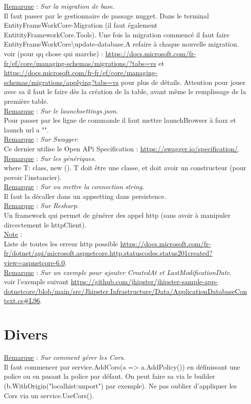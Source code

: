 \documentclass[a4paper,12pt,twoside]{article}
\newcommand{\rem}[2]{\noindent\underline{Remarque} : \textit{#1}.\\ \indent #2}
\newcommand{\note}[1]{\noindent\underline{Note} : \\ \indent #1}
\begin{document}
\rem{Sur la migration de base}{Il faut passer par le gestionnaire de passage nugget. Dans le terminal EntityFrameWorkCore\Add-Migration (il faut également EntitityFrameworkCore.Tools). Une fois la migration commencé il faut faire EntityFrameWorkCore\textbackslash update-database.A refaire à chaque nouvelle migration. voir (pour qq chose qui marche) : \url{https://docs.microsoft.com/fr-fr/ef/core/managing-schemas/migrations/?tabs=vs} et \url{https://docs.microsoft.com/fr-fr/ef/core/managing-schemas/migrations/applying?tabs=vs} pour plus de détails. Attention pour jouer avec sa il faut le faire dès la création de la table, avant même le remplissage de la première table.}\\

\rem{Sur le launchsettings.json}{Pour passer par les ligne de commande il faut mettre launchBrowser à faux et launch url a "".}\\

\rem{Sur Swagger}{Ce dernier utilise le Open APi Specification : \url{https://swagger.io/specification/}.}\\

\rem{Sur les génériques}{where T: class, new (). T doit être une classe, et doit avoir un constructeur (pour povoir l'instancier).}\\

\rem{Sur ou mettre la connection string}{Il faut la décaller dans un appsetting dans persistence.}\\

\rem{Sur Resharp}{Un framework qui permet de générer des appel http (sans avoir à manipuler dircectement le httpClient).}\\

\note{Liste de toutes les erreur http possible \url{https://docs.microsoft.com/fr-fr/dotnet/api/microsoft.aspnetcore.http.statuscodes.status201created?view=aspnetcore-6.0}.}\\

\rem{Sur un exemple pour ajouter CreatedAt et LastModificationDate}{voir l'exemple suivant \url{https://github.com/jhipster/jhipster-sample-app-dotnetcore/blob/main/src/Jhipster.Infrastructure/Data/ApplicationDatabaseContext.cs#L96}.}\\

\section{Divers}

\rem{Sur comment gérer les Cors}{Il faut commencer par service.AddCors(a => a.AddPolicy()) en définissant une police ou en pasant la police par défaut. On peut faire sa via le builder (b.WithOrigin("localhist:unport") par exemple). Ne pas oublier d'appliquer les Cors via un service.UseCors().}\\
\end{document}
